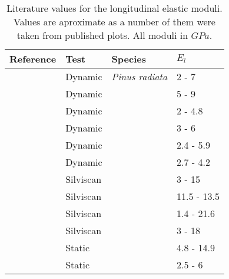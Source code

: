 \documentclass[10pt]{article}
\begin{document}
\begin{table}
\caption[Further literature comparison]{Literature values for the longitudinal elastic moduli. Values are aproximate as a number of them were taken from published plots. All moduli in \(GPa\).}
\label{table:lit_comp_long}
\begin{tabular}{llll}
\hline
Reference & Test & Species & \(E_l\) \\
\hline
\cite{watt_modelling_2006}&Dynamic &\textit{Pinus radiata} &  2 - 7 \\
\cite{waghorn_influence_2007}&Dynamic  &  & 5 - 9 \\
\cite{lindstrom_stiffness_2004}&Dynamic  &   & 2 - 4.8 \\
\cite{xinguo_transcriptome_2011}&Dynamic  &  & 3 - 6 \\
\cite{s_modelling_2008}&Dynamic  & &  2.4 - 5.9 \\
\cite{lasserre_influence_2009}&Dynamic & &  2.7 - 4.2 \\
\cite{watt_influence_2011}& Silviscan &  & 3 - 15\\
\cite{downes_relationship_2002}&Silviscan & &   11.5 - 13.5 \\
\cite{watt_determining_2010}&Silviscan &  &  1.4 - 21.6\\
\cite{s_development_2010}&Silviscan & &   3 - 18\\
\cite{xu_effects_2004}& Static & &  4.8 - 14.9\\
\cite{lindstrom_methods_2002}& Static & & 2.5 - 6 \\
\hline
\end{tabular}
\end{table}
\end{document}
